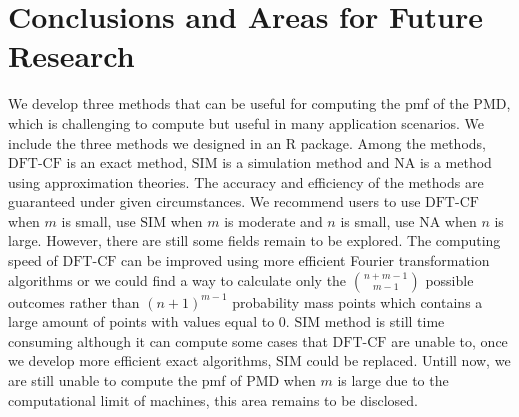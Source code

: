 \documentclass[12pt]{article}
\newcommand{\PMD}{\textrm{PMD}}
\newcommand{\SIM}{{\textrm{SIM}}}
\newcommand{\NA}{{\textrm{NA}}}
\newcommand{\dft}{{\textrm{DFT-CF}}}
\begin{document}



\section{Conclusions and Areas for Future Research}\label{sec:conclusion}

We develop three methods that can be useful for computing the pmf of the PMD, which is challenging to compute but useful in many application scenarios. We include the three methods we designed in an R package. Among the methods, $\dft$ is an exact method, $\SIM$ is a simulation method and $\NA$ is a method using approximation theories. The accuracy and efficiency of the methods are guaranteed under given circumstances. We recommend users to use $\dft$ when $m$ is small, use $\SIM$ when $m$ is moderate and $n$ is small, use $\NA$ when $n$ is large. However, there are still some fields remain to be explored. The computing speed of $\dft$ can be improved using more efficient Fourier transformation algorithms or we could find a way to calculate only the $\binom{n+m-1}{m-1}$ possible outcomes rather than $(n+1)^{m-1}$ probability mass points which contains a large amount of points with values equal to 0. $\SIM$ method is still time consuming although it can compute some cases that $\dft$ are unable to, once we develop more efficient exact algorithms, $\SIM$ could be replaced. Untill now, we are still unable to compute the pmf of $\PMD$ when $m$ is large due to the computational limit of machines, this area remains to be disclosed.



%



%	
	
\end{document}
